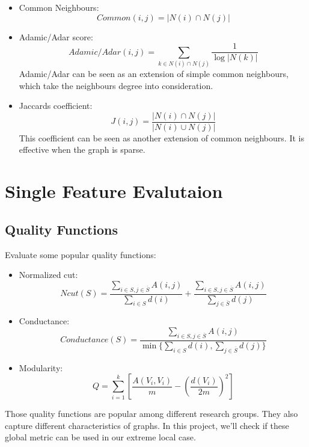 \documentclass[11pt,a4paper]{article}
\begin{document}
		\begin{itemize}

			\item Common Neighbours:
			\begin{equation}
				Common(i,j) = | N(i) \cap N(j) |
			\end{equation}
			\item Adamic/Adar score:
			\begin{equation}
				Adamic/Adar(i,j) = \sum_{k \in N(i) \cap N(j) }{\frac{1}{\log{|N(k)|}}}
			\end{equation}
			Adamic/Adar can be seen as an extension of simple common neighbours, which 
			take the neighbours degree into consideration. 
			\item Jaccards coefficient:
			\begin{equation}
				J(i,j)=\frac{|N(i) \cap N(j) |}{|N(i) \cup N(j) |}
			\end{equation}
			This coefficient can be seen as another extension of common neighbours. 
			It is effective when the graph is sparse. 
		\end{itemize}

\section{Single Feature Evalutaion}

\subsection{Quality Functions}



Evaluate some popular quality functions:
				\begin{itemize}
					\item Normalized cut:
					\begin{equation}
						Ncut(S)=\frac{\sum_{i \in S, j \in \overline{S}}{A(i,j)}}
						{\sum_{i \in S}{d(i)}}
						+ \frac{\sum_{i \in S, j \in \overline{S}}{A(i,j)}}
						{\sum_{j \in \overline{S}}{d(j)}}						
					\end{equation}
					\item Conductance:
					\begin{equation}
						Conductance(S)=\frac{\sum_{i \in S, j \in \overline{S}}{A(i,j)}}
						{\min \{ \sum_{i \in S}{d(i)}, \sum_{j \in \overline{S}}{d(j)}\}}				
					\end{equation}
					\item Modularity:
					\begin{equation}
						Q=\sum_{i=1}^{k}{\left[ 
						\frac{A(V_i,V_i)}{m} 
						-\left( \frac{d(V_i)}{2m}\right)^2
						\right]}
					\end{equation}
				\end{itemize}
				Those quality functions are popular among different research 
				groups. They also capture different characteristics of graphs. 
				In this project, we'll check if these global metric can 
				be used in our extreme local case. 
\end{document}
